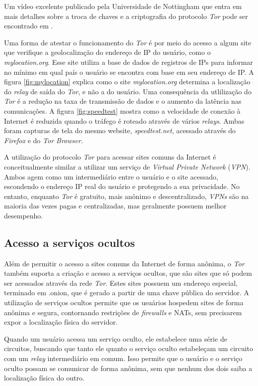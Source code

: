Um vídeo excelente publicado pela Universidade de Nottingham que entra em mais detalhes sobre a troca de chaves e a criptografia do protocolo \textit{Tor} pode ser encontrado em \cite{computerphile-tor}.

Uma forma de atestar o funcionamento do \textit{Tor} é por meio do acesso a algum site que verifique a geolocalização do endereço de IP do usuário, como o \textit{mylocation.org}. Esse site utiliza a base de dados de registros de IPs para informar no mínimo em qual país o usuário se encontra com base em seu endereço de IP. A figura \ref{fig:mylocation} explica como o site \textit{mylocation.org} determina a localização do \textit{relay} de saída do \textit{Tor}, e não a do usuário. Uma consequência da utlilização do \textit{Tor} é a redução na taxa de transmissão de dados e o aumento da latência nas comunicações. A figura \ref{fig:speedtest} mostra como a velocidade de conexão à Internet é reduzida quando o tráfego é roteado através de vários \textit{relays}. Ambas foram capturas de tela do mesmo website, \textit{speedtest.net}, acessado através do \textit{Firefox} e do \textit{Tor Browser}.

A utilização do protocolo \textit{Tor} para acessar sites comuns da Internet é conceitualmente similar a utilizar um serviço de \textit{Virtual Private Network} (\textit{VPN}). Ambos agem como um intermediário entre o usuário e o site acessado, escondendo o endereço IP real do usuário e protegendo a sua privacidade. No entanto, enquanto \textit{Tor} é gratuito, mais anônimo e descentralizado, \textit{VPNs} são na maioria das vezes pagas e centralizadas, mas geralmente possuem melhor desempenho.

\subsection{Acesso a serviços ocultos}

Além de permitir o acesso a sites comuns da Internet de forma anônima, o \textit{Tor} também suporta a criação e acesso a serviços ocultos, que são sites que só podem ser acessados através da rede \textit{Tor}. Estes sites possuem um endereço especial, terminado em .onion, que é gerado a partir de uma chave pública do servidor. A utilização de serviços ocultos permite que os usuários hospedem sites de forma anônima e segura, contornando restrições de \textit{firewalls} e NATs, sem precisarem expor a localização física do servidor.

Quando um usuário acessa um serviço oculto, ele estabelece uma série de circuitos, buscando que tanto ele quanto o serviço oculto estabeleçam um circuito com um \textit{relay} intermediário em comum. Isso permite que o usuário e o serviço oculto possam se comunicar de forma anônima, sem que nenhum dos dois saiba a localização física do outro.

